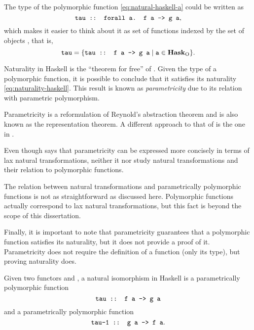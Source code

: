 The type of the polymorphic function 
\eqref{eq:natural-haskell-a} could be written as
\begin{equation}
  \label{eq:natural-haskell-b}
  \text{\texttt{tau :: forall a. f a -> g a}}
  \text{,}
\end{equation}
which makes it easier to think about it as set of functions indexed
by the set of objects \catO{\hask}, that is,
\begin{equation*}
  \text{\texttt{tau}} =
  \{\text{\texttt{tau :: f a -> g a}} \mid \text{\texttt{a}}
  \in \mathcal{\mathbf{Hask}}_{\operatorname{O}}\}
  \text{.}
\end{equation*}

Naturality in Haskell is the ``theorem for free'' of
\parencite{wadler-1989}. Given the type of a polymorphic function, it
is possible to conclude that it satisfies its naturality
\eqref{eq:naturality-haskell}. This result is known as
\emph{parametricity} due to its relation with
parametric polymorphism.

Parametricity is a reformulation of Reynold's abstraction theorem and
is also known as the representation theorem. A different approach to
that of \parencite{wadler-1989} is the one in \parencite{abadi-1993}.

Even though \parencite[page 350]{wadler-1989} says that parametricity
can be expressed more concisely in terms of lax natural
transformations, neither it nor \parencite{abadi-1993} study natural
transformations and their relation to polymorphic functions.

The relation between natural transformations and parametrically
polymorphic functions is not as straightforward as discussed here.
Polymorphic functions actually correspond to lax natural
transformations, but this fact is beyond the scope of this
dissertation.

Finally, it is important to note that parametricity guarantees that a
polymorphic function satisfies its naturality, but it does not provide
a proof of it. Parametricity does not require the definition of a
function (only its type), but proving naturality does.

\begin{remark}

  Given two functors  and , a natural
  isomorphism in Haskell is a parametrically polymorphic function
  \begin{equation*}
    \text{\texttt{tau :: f a -> g a}}
  \end{equation*}
  and a parametrically polymorphic function
  \begin{equation*}
    \text{\texttt{tau-1 :: g a -> f a}}
    \text{.}
  \end{equation*}

\end{remark}

